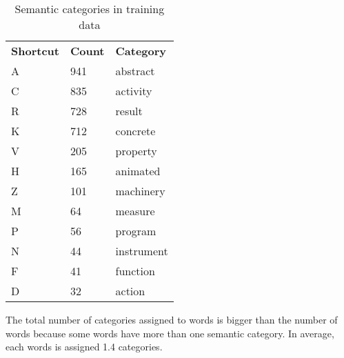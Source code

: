 \documentclass[letterpaper]{article}
\newcommand{\todofn}[1] {
 \footnote{\textbf{TODO : #1}}}
\begin{document}
\begin{table}
\begin{tabular}{|l|l|l|}
 \hline
\textbf{Shortcut} &  \textbf{Count} & \textbf{Category}\\
A & 941 & abstract \\ \hline
C & 835 & activity \\ \hline
R & 728 & result \\ \hline
K & 712 & concrete \\ \hline
V & 205 & property \\ \hline
H & 165 & animated \\ \hline
Z & 101 & machinery \\ \hline
M & 64 & measure\\ \hline
P & 56 & program \\ \hline
N & 44 & instrument \\ \hline
F & 41 & function \\ \hline
D & 32 & action \\ \hline

\end{tabular}
\caption{Semantic categories in training data}
\end{table}


The total number of categories assigned to words is bigger than the number of words because 
some words have more than one semantic category. In average, each words is assigned 1.4 categories.


\end{document}
